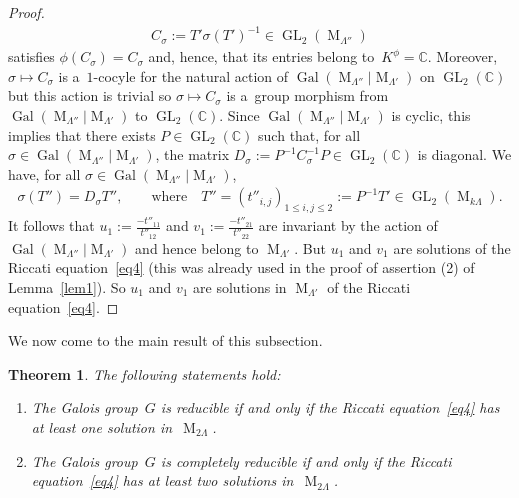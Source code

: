 \documentclass[10pt,a4paper]{amsart}
\numberwithin{equation}{section}
\newtheorem{Theorem}{Theorem}[section]
\begin{document}
\begin{proof}
\begin{gather*}
C_{\sigma}:=T' \sigma (T' )^{-1} \in \operatorname{GL}_{2}(\operatorname{M}_{\Lambda''})
\end{gather*}
satisf\/ies $\phi (C_{\sigma}) = C_{\sigma}$ and, hence, that its entries belong to~$K^{\phi} = \mathbb C$.
Moreover, $\sigma \mapsto C_{\sigma}$ is a~$1$-cocyle for the natural action of
$\operatorname{Gal}(\operatorname{M}_{\Lambda''}|\operatorname{M}_{\Lambda'})$ on $\operatorname{GL}_{2}(\mathbb C)$
but this action is trivial so $\sigma \mapsto C_{\sigma}$ is a~group morphism
from~$\operatorname{Gal}(\operatorname{M}_{\Lambda''}|\operatorname{M}_{\Lambda'})$ to $\operatorname{GL}_{2}(\mathbb
C)$.
Since $\operatorname{Gal}(\operatorname{M}_{\Lambda''}|\operatorname{M}_{\Lambda'})$ is cyclic, this implies that there
exists $P\in \operatorname{GL}_{2}(\mathbb C)$ such that, for all $\sigma\in
\operatorname{Gal}(\operatorname{M}_{\Lambda''}|\operatorname{M}_{\Lambda'})$, the matrix
${D_{\sigma}:=P^{-1}C_{\sigma}^{-1}P} \in \operatorname{GL}_{2}(\mathbb C)$ is diagonal.
We have, for all $\sigma \in\operatorname{Gal}(\operatorname{M}_{\Lambda''}|\operatorname{M}_{\Lambda'})$,
\begin{gather*}
\sigma(T'')=D_{\sigma}T'',\qquad  \text{where} \quad T''=(t''_{i,j})_{1 \leq i,j \leq 2}:=P^{-1}T' \in
\operatorname{GL}_{2}(\operatorname{M}_{k \Lambda}).
\end{gather*}
It follows that $u_{1}:=\frac{-t''_{11}}{t''_{12}}$ and $v_{1}:=\frac{-t''_{21}}{t''_{22}}$ are invariant by the action
of $\operatorname{Gal}(\operatorname{M}_{\Lambda''}|\operatorname{M}_{\Lambda'})$ and hence belong to
$\operatorname{M}_{\Lambda'}$.
But $u_{1}$ and $v_{1}$ are solutions of the Riccati equation~\eqref{eq4} (this was already used in the proof of
assertion (2) of Lemma~\ref{lem1}).
So $u_{1}$ and $v_{1}$ are solutions in $\operatorname{M}_{\Lambda'}$ of the Riccati equation~\eqref{eq4}.
\end{proof}

We now come to the main result of this subsection.

\begin{Theorem}
\label{theo2}
The following statements hold:
\begin{enumerate}
\itemsep=0pt
\item[$1.$] The Galois group~$G$ is reducible if and only if the Riccati equation~\eqref{eq4} has at least one solution
in~$\operatorname{M}_{2\Lambda}$.
\item[$2.$] The Galois group~$G$ is completely reducible if and only if the Riccati equation~\eqref{eq4} has at least two
solutions in~$\operatorname{M}_{2\Lambda}$.
\end{enumerate}
\end{Theorem}
\end{document}

